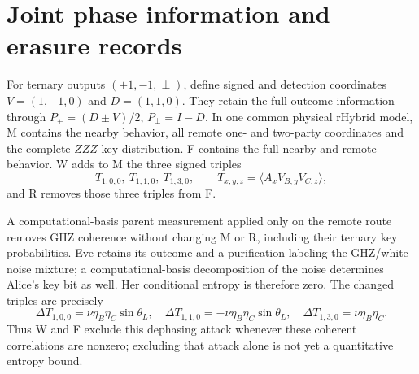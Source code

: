 \documentclass[aps,10pt,onecolumn,prx,superscriptaddress,longbibliography,nofootinbib]{revtex4-2}
\newcommand{\perpout}{\perp}
\newcommand{\rHybrid}{\mathrm{rHybrid}}
\begin{document}
\section{Joint phase information and erasure records}\label{app:ideal-mwrf}

For ternary outputs \((+1,-1,\perpout)\), define signed and detection coordinates \(V=(1,-1,0)\) and \(D=(1,1,0)\). They retain the full outcome information through \(P_\pm=(D\pm V)/2\), \(P_\perp=I-D\). In one common physical \(\rHybrid\) model, M contains the nearby behavior, all remote one- and two-party coordinates and the complete \(ZZZ\) key distribution. F contains the full nearby and remote behavior. W adds to M the three signed triples
\begin{equation}
 T_{1,0,0},\ T_{1,1,0},\ T_{1,3,0},\qquad
 T_{x,y,z}=\langle A_xV_{B,y}V_{C,z}\rangle,
\end{equation}
and R removes those three triples from F.

A computational-basis parent measurement applied only on the remote route removes GHZ coherence without changing M or R, including their ternary key probabilities. Eve retains its outcome and a purification labeling the GHZ/white-noise mixture; a computational-basis decomposition of the noise determines Alice's key bit as well. Her conditional entropy is therefore zero. The changed triples are precisely
\begin{equation}
 \Delta T_{1,0,0}=\nu\eta_B\eta_C\sin\theta_L,\quad
 \Delta T_{1,1,0}=-\nu\eta_B\eta_C\sin\theta_L,\quad
 \Delta T_{1,3,0}=\nu\eta_B\eta_C.
 \label{eq:coherent-differences}
\end{equation}
Thus W and F exclude this dephasing attack whenever these coherent correlations are nonzero; excluding that attack alone is not yet a quantitative entropy bound.
\end{document}
